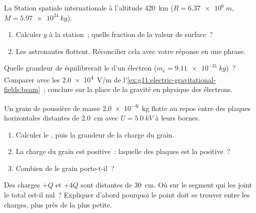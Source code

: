 \begin{exercise}[$\star\star$]\label{exo:g11:electric-gravitational-fields:6}
La Station spatiale internationale
 à l'altitude \qty{420}{km}
($R = \qty{6.37e6}{m}$, $M = \qty{5.97e24}{kg}$).
\begin{enumerate}
  \item Calculer $g$ à la station~; quelle fraction de la valeur de
        surface~?
  \item Les astronautes flottent. Réconcilier cela avec votre réponse en
        une phrase.
\end{enumerate}
\end{exercise}

\begin{exercise}[$\star\star$]\label{exo:g11:electric-gravitational-fields:7}
Quelle grandeur de 
équilibrerait le  d'un électron
($m_e = \qty{9.11e-31}{kg}$)~? Comparer avec les \qty{2.0e4}{V/m} de
l'\cref{ex:g11:electric-gravitational-fields:beam}~; conclure sur la
place de la gravité en physique des électrons.
\end{exercise}

\begin{exercise}[$\star\star$]\label{exo:g11:electric-gravitational-fields:8}
Un grain de poussière de masse \qty{2.0e-6}{kg} flotte au repos entre
des plaques horizontales distantes de \qty{2.0}{cm} avec
$U = \qty{5.0}{kV}$ à leurs bornes.
\begin{enumerate}
  \item Calculer le , puis la
        grandeur de la charge du grain.
  \item La charge du grain est positive~: laquelle des plaques est la
        positive~?
  \item Combien de  le grain porte-t-il~?
\end{enumerate}
\end{exercise}

\begin{exercise}[$\star\star$]\label{exo:g11:electric-gravitational-fields:9}
Des charges $+Q$ et $+4Q$ sont distantes de \qty{30}{cm}. Où sur le
segment qui les joint le  total
est-il nul~? Expliquer d'abord pourquoi le point doit se trouver entre
les charges, plus près de la plus petite.
\end{exercise}

